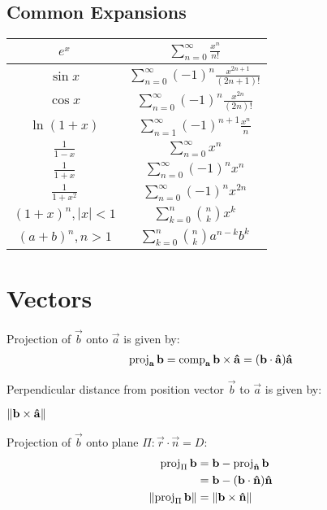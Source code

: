 \documentclass[12pt, a4paper]{article}
\begin{document}
\begin{multicols*}{3}
\subsection{Common Expansions}
{\centering
\setlength{\extrarowheight}{7pt}
\begin{tabular}{|c|c|}
\hline
$e^x$ & $\sum^{\infty}_{n=0} \displaystyle\frac{x^n}{n!}$ \\ \hline
$\sin x$ & $\sum^{\infty}_{n=0} (-1)^n \displaystyle\frac{x^{2n+1}}{(2n+1)!}$ \\ \hline
$\cos x$ & $\sum^{\infty}_{n=0} (-1)^n \displaystyle\frac{x^{2n}}{(2n)!}$ \\ \hline
$\ln (1+x)$ & $\sum^{\infty}_{n=1} (-1)^{n+1} \displaystyle\frac{x^n}{n}$ \\ \hline
$\displaystyle\frac{1}{1-x}$ & $\sum^{\infty}_{n=0} x^n$ \\ \hline
$\displaystyle\frac{1}{1+x}$ & $\sum^{\infty}_{n=0} (-1)^n x^n$ \\ \hline
$\displaystyle\frac{1}{1+x^2}$ & $\sum^{\infty}_{n=0} (-1)^n x^{2n}$ \\ \hline
$(1+x)^n, |x|<1$ & $\sum^{n}_{k=0} \displaystyle\binom nk x^k$ \\ \hline
$(a+b)^n, n>1$ & $\sum^{n}_{k=0} \displaystyle \binom nk a^{n-k}b^k$\\ \hline
\end{tabular}
\par}
\section{Vectors}
Projection of $\vec{b}$ onto $\vec{a}$ is given by:
\begin{align*}
  \displaystyle \operatorname{proj}_{\mathbf{a}}\mathbf{b} = \operatorname{comp}_{\mathbf{a}}\mathbf{b} \times \mathbf{\hat{a}} = (\mathbf{b} \cdot \mathbf{\hat{a}}) \mathbf{\hat{a}}
\end{align*}

Perpendicular distance from position vector $\vec{b}$ to $\vec{a}$ is given by:\\
{\centering
  $\displaystyle \lVert\mathbf{b} \times \mathbf{\hat{a}}\rVert$
\par}

Projection of $\vec{b}$ onto plane $\Pi: \vec{r} \cdot \vec{n} = D$:
\begin{align*}
  \displaystyle \operatorname{proj}_{\Pi}\mathbf{b} &= \mathbf{b} - \operatorname{proj}_{\mathbf{\hat{n}}}\mathbf{b} \\&= \mathbf{b} - (\mathbf{b} \cdot \mathbf{\hat{n}})\mathbf{\hat{n}}\\
  \displaystyle \lVert\operatorname{proj}_{\Pi}\mathbf{b}\rVert &= \lVert\mathbf{b} \times \mathbf{\hat{n}}\rVert
\end{align*}


\end{multicols*}
\end{document}

